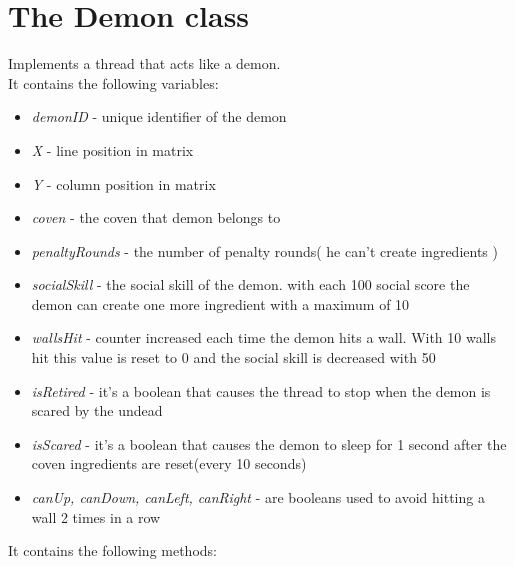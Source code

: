 \documentclass[14pt]{article}
\begin{document}
\section*{The Demon class}
\vspace{5 mm}
Implements a thread that acts like a demon.\\
It contains the following variables:\\ 
\begin{itemize}
            \item \textit{demonID} - unique identifier of the demon
            \item \textit{X} - line position in matrix
            \item \textit{Y} - column position in matrix
            \item \textit{coven} - the coven that demon belongs to
            \item \textit{penaltyRounds} - the number of penalty rounds( he can't create ingredients )
            \item \textit{socialSkill} - the social skill of the demon. with each 100 social score the demon can create one more ingredient with a maximum of 10
            \item \textit{wallsHit} - counter increased each time the demon hits a wall. With 10 walls hit this value is reset to 0 and the social skill is decreased with 50
            \item \textit{isRetired} - it's a boolean that causes the thread to stop when the demon is scared by the undead
            \item \textit{isScared} - it's a boolean that causes the demon to sleep for 1 second after the coven ingredients are reset(every 10 seconds)
            \item \textit{canUp, canDown, canLeft, canRight} - are booleans used to avoid hitting a wall 2 times in a row
\end{itemize}
It contains the following methods:\\
\end{document}
